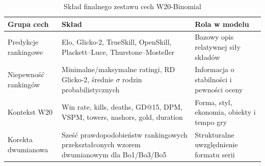\begin{table}[H]
    \centering
    \small
    \caption{Skład finalnego zestawu cech W20-Binomial}
    \label{tab:metamodel_feature_sets}
    \begin{tabular}{p{3.4cm}p{7.3cm}p{3.3cm}}
        \toprule
        Grupa cech & Skład & Rola w modelu \\
        \midrule
        Predykcje rankingowe & Elo, Glicko-2, TrueSkill, OpenSkill, Plackett--Luce, Thurstone--Mosteller & Bazowy opis relatywnej siły składów \\
        Niepewność rankingów & Minimalne/maksymalne ratingi, RD Glicko-2, średnie $\sigma$ rodzin probabilistycznych & Informacja o stabilności i pewności oceny \\
        Kontekst W20 & Win rate, kills, deaths, GD@15, DPM, VSPM, towers, nashors, gold, duration & Forma, styl, ekonomia, obiekty i tempo gry \\
        Korekta dwumianowa & Sześć prawdopodobieństw rankingowych przekształconych wzorem dwumianowym dla Bo1/Bo3/Bo5 & Strukturalne uwzględnienie formatu serii \\
        \bottomrule
    \end{tabular}
\end{table}

